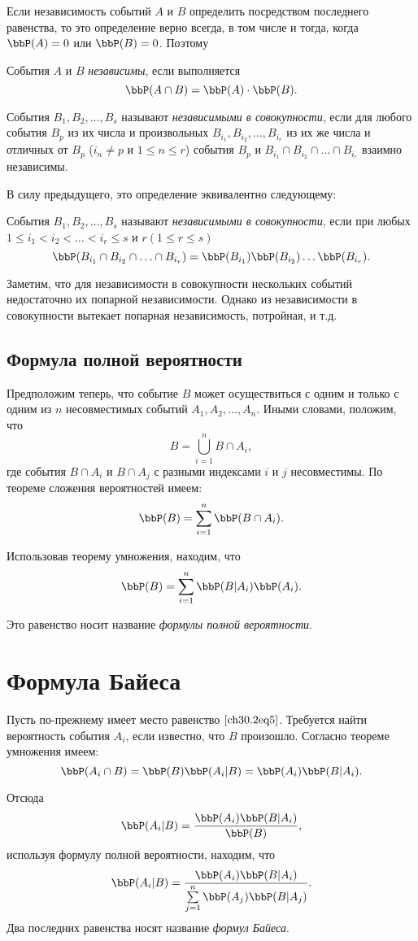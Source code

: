 Если независимость событий $A$ и $B$ определить посредством последнего равенства, то это определение верно всегда, в том числе и тогда, когда $\bbP(A) = 0$ или $\bbP(B) = 0$. Поэтому
\begin{defn}
События $A$ и $B$ \textit{независимы}, если выполняется $$\bbP(A\cap B) = \bbP(A)\cdot \bbP(B).$$
\end{defn}

События $B_1,B_2, \ldots, B_s$ называют \textit{независимыми в совокупности}, если для любого события $B_p$ из их числа и произвольных $B_{i_1}, B_{i_2}, \ldots, B_{i_r}$ из их же числа и отличных от $B_p$  ($i_n \not= p$  и $1 \le n \le r$) события $B_p$ и $B_{i_1}\cap B_{i_2}\cap \ldots\cap B_{i_r}$ взаимно независимы.

В силу предыдущего, это определение эквивалентно следующему:
\begin{defn} События $B_1,B_2, \ldots, B_s$ называют \textit{независимыми в совокупности}, если при любых $1 \le i_1 < i_2 < \ldots < i_r \le s$ и $r (1 \le r \le s)$
$$
\bbP(B_{i_1}\cap B_{i_2}\cap\ldots\cap B_{i_r}) = \bbP(B_{i_1})\bbP(B_{i_2}) \ldots \bbP(B_{i_r}).
$$
\end{defn}
Заметим, что для независимости в совокупности нескольких событий недостаточно их попарной независимости. Однако из независимости в совокупности вытекает попарная независимость, потройная, и т.д.

\subsection{Формула полной вероятности}
Предположим теперь, что событие $B$ может осуществиться с одним и только с одним из $n$ несовместимых событий $A_1,A_2, \ldots, A_n$. Иными словами, положим, что
\begin{equation} \label{ch30.2eq5}
B = \bigcup\limits_{i = 1}^{n} B \cap A_i,
\end{equation}
где события $B\cap A_i$ и $B\cap A_j$ с разными индексами $i$ и $j$ несовместимы. По теореме сложения вероятностей имеем:
$$
\bbP(B) = \sum_{i = 1}^{n} \bbP(B\cap A_i).
$$

Использовав теорему умножения, находим, что
$$
\bbP(B) = \sum_{i = 1}^{n} \bbP(B|A_i)\bbP(A_i).
$$

Это равенство носит название \textit{формулы полной вероятности}.

\section{Формула Байеса}
Пусть по-прежнему имеет место равенство $\eqref{ch30.2eq5}$. Требуется найти вероятность события $A_i$, если известно, что $B$ произошло. Согласно теореме умножения имеем:
$$
\bbP(A_i\cap B) = \bbP(B)\bbP(A_i|B) = \bbP(A_i)\bbP(B|A_i).
$$

Отсюда
$$
\bbP(A_i|B) = \frac{\bbP(A_i)\bbP(B|A_i)}{\bbP(B)},
$$
используя формулу полной вероятности, находим, что
$$
\bbP(A_i|B) = \frac{\bbP(A_i)\bbP(B|A_i)}{\sum\limits_{j = 1}^{n} \bbP(A_j)\bbP(B|A_j)}.
$$
Два последних равенства носят название \textit{формул Байеса}.

